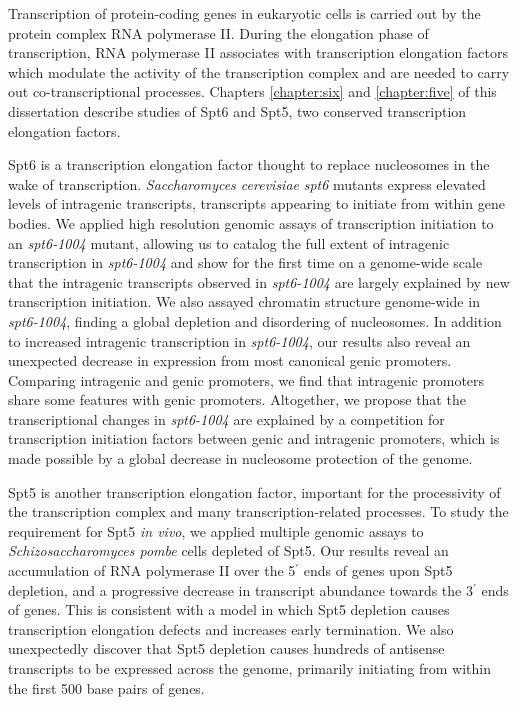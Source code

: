 \begin{abstractpage}

Transcription of protein-coding genes in eukaryotic cells is carried out by the protein complex RNA polymerase II.
During the elongation phase of transcription, RNA polymerase II associates with transcription elongation factors which modulate the activity of the transcription complex and are needed to carry out co-transcriptional processes.
Chapters \ref{chapter:six} and \ref{chapter:five} of this dissertation describe studies of Spt6 and Spt5, two conserved transcription elongation factors.

Spt6 is a transcription elongation factor thought to replace nucleosomes in the wake of transcription.
\textit{Saccharomyces cerevisiae} \textit{spt6} mutants express elevated levels of intragenic transcripts, transcripts appearing to initiate from within gene bodies.
We applied high resolution genomic assays of transcription initiation to an \textit{spt6-1004} mutant, allowing us to catalog the full extent of intragenic transcription in \textit{spt6-1004} and show for the first time on a genome-wide scale that the intragenic transcripts observed in \textit{spt6-1004} are largely explained by new transcription initiation.
We also assayed chromatin structure genome-wide in \textit{spt6-1004}, finding a global depletion and disordering of nucleosomes.
In addition to increased intragenic transcription in \textit{spt6-1004}, our results also reveal an unexpected decrease in expression from most canonical genic promoters.
Comparing intragenic and genic promoters, we find that intragenic promoters share some features with genic promoters.
Altogether, we propose that the transcriptional changes in \textit{spt6-1004} are explained by a competition for transcription initiation factors between genic and intragenic promoters, which is made possible by a global decrease in nucleosome protection of the genome.

Spt5 is another transcription elongation factor, important for the processivity of the transcription complex and many transcription-related processes.
To study the requirement for Spt5 \textit{in vivo}, we applied multiple genomic assays to \textit{Schizosaccharomyces pombe} cells depleted of Spt5.
Our results reveal an accumulation of RNA polymerase II over the 5$^\prime$ ends of genes upon Spt5 depletion, and a progressive decrease in transcript abundance towards the 3$^\prime$ ends of genes.
This is consistent with a model in which Spt5 depletion causes transcription elongation defects and increases early termination.
We also unexpectedly discover that Spt5 depletion causes hundreds of antisense transcripts to be expressed across the genome, primarily initiating from within the first 500 base pairs of genes.


\end{abstractpage}
